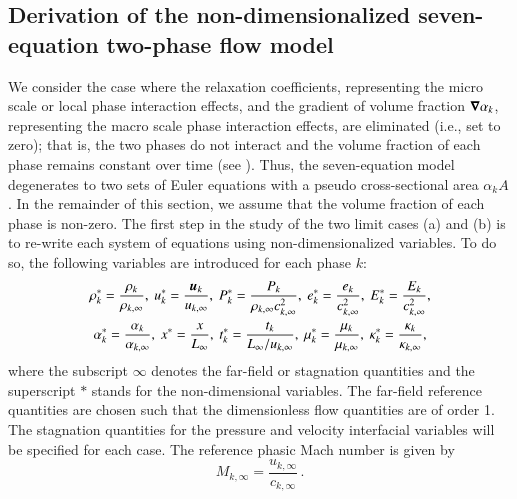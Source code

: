 \subsection{Derivation of the non-dimensionalized seven-equation two-phase flow model}\label{sec:scaled-SEM}
We consider the case where the relaxation coefficients, representing the micro scale or local phase interaction effects, 
and the gradient of volume fraction $\boldsymbol\nabla \alpha_k$, representing the macro scale phase interaction effects, are eliminated (i.e., set to zero); that is, 
the two phases do not interact and the volume fraction of each phase remains constant over time (see ). 
Thus, the seven-equation model degenerates to two sets of Euler equations with a pseudo cross-sectional area $\alpha_k A$. In 
the remainder of this section, we assume that the volume fraction of each phase is non-zero.
%
The first step in the study of the two limit cases (a) and (b) is to re-write each system of equations using non-dimensionalized 
variables. To do so, the following variables are introduced for each phase $k$:
%
\begin{multline}
\label{eq:norm_param}
\rho_k^*   = \frac{\rho_k}{\rho_{k,\infty}}           ,\
u_k^*      = \frac{\boldsymbol u_k}{u_{k,\infty}}                 ,\
P_k^*      = \frac{P_k}{\rho_{k,\infty} c^2_{k,\infty}}   ,\
e_k^*      = \frac{e_k}{c^2_{k,\infty} }              , \
E_k^*      = \frac{E_k}{c^2_{k,\infty} }              , \\
\alpha_k^*      = \frac{\alpha_k}{\alpha_{k,\infty} }              , \
x^* = \frac{x}{L_\infty}                      ,\
t_k^* = \frac{t_k}{L_\infty / u_{k,\infty}}           ,\
\mu_k^*    = \frac{\mu_k}{\mu_{k,\infty}}             ,\
\kappa_k^* = \frac{\kappa_k}{\kappa_{k,\infty}}       ,
\end{multline}
%
where  the subscript $\infty$ denotes the far-field or stagnation quantities and the superscript $*$ stands for the non-dimensional variables.
The far-field reference quantities are chosen such that the dimensionless flow quantities are of order 1. The stagnation quantities for 
the pressure and velocity interfacial variables will be specified for each case. The reference phasic Mach number is given by
%
\begin{equation}
M_{k,\infty} = \frac{u_{k,\infty}}{c_{k,\infty}} \,.
\end{equation}
